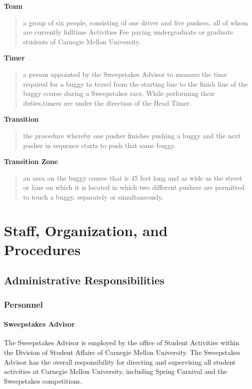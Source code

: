 \documentclass[openany]{book}
\begin{document}
\textbf{Team}
\begin{quote}
	a group of six people, consisting of one driver and five pushers, all of whom are currently fulltime Activities Fee paying undergraduate or graduate students of Carnegie Mellon University.
\end{quote}

\textbf{Timer}
\begin{quote}
	a person appointed by the Sweepstakes Advisor to measure the time required for a buggy to travel from the starting line to the finish line of the buggy course during a Sweepstakes race. While performing their duties,timers are under the direction of the Head Timer.
\end{quote}

\textbf{Transition}
\begin{quote}
	the procedure whereby one pusher finishes pushing a buggy and the next pusher in sequence starts to push that same buggy.
\end{quote}

\textbf{Transition Zone}
\begin{quote}
	an area on the buggy course that is 45 feet long and as wide as the street or lane on which it is located in which two different pushers are permitted to touch a buggy, separately or simultaneously.
\end{quote}

\chapter{Staff, Organization, and Procedures}

\section{Administrative Responsibilities}

\subsection{Personnel}

\subsubsection{Sweepstakes Advisor}

The Sweepstakes Advisor is employed by the office of Student Activities within the Division of Student Affairs of Carnegie Mellon University. The Sweepstakes Advisor has the overall responsibility for directing and supervising all student activities at Carnegie Mellon University, including Spring Carnival and the Sweepstakes competitions.
\end{document}
